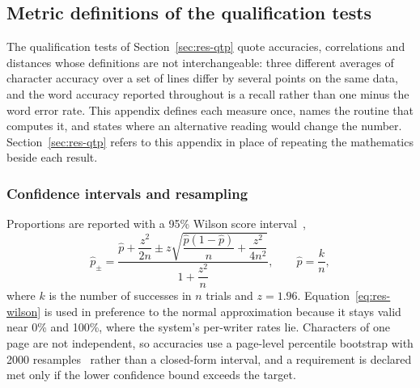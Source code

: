 
\subsection{Metric definitions of the qualification tests}
\label{sec:app-met}

The qualification tests of Section~\ref{sec:res-qtp} quote accuracies, correlations and distances whose definitions are not interchangeable: three different averages of character accuracy over a set of lines differ by several points on the same data, and the word accuracy reported throughout is a recall rather than one minus the word error rate.
This appendix defines each measure once, names the routine that computes it, and states where an alternative reading would change the number.
Section~\ref{sec:res-qtp} refers to this appendix in place of repeating the mathematics beside each result.

\subsubsection{Confidence intervals and resampling}

Proportions are reported with a 95\% Wilson score interval~\cite{wilson1927},
\begin{equation}
\label{eq:res-wilson}
\hat p_{\pm}=\frac{\hat p+\dfrac{z^2}{2n}\pm z\sqrt{\dfrac{\hat p(1-\hat p)}{n}+\dfrac{z^2}{4n^2}}}{1+\dfrac{z^2}{n}},\qquad \hat p=\frac{k}{n},
\end{equation}
where $k$ is the number of successes in $n$ trials and $z=1.96$.
Equation~\ref{eq:res-wilson} is used in preference to the normal approximation because it stays valid near 0\% and 100\%, where the system's per-writer rates lie.
Characters of one page are not independent, so accuracies use a page-level percentile bootstrap with 2000 resamples~\cite{efron1979} rather than a closed-form interval, and a requirement is declared met only if the lower confidence bound exceeds the target.

